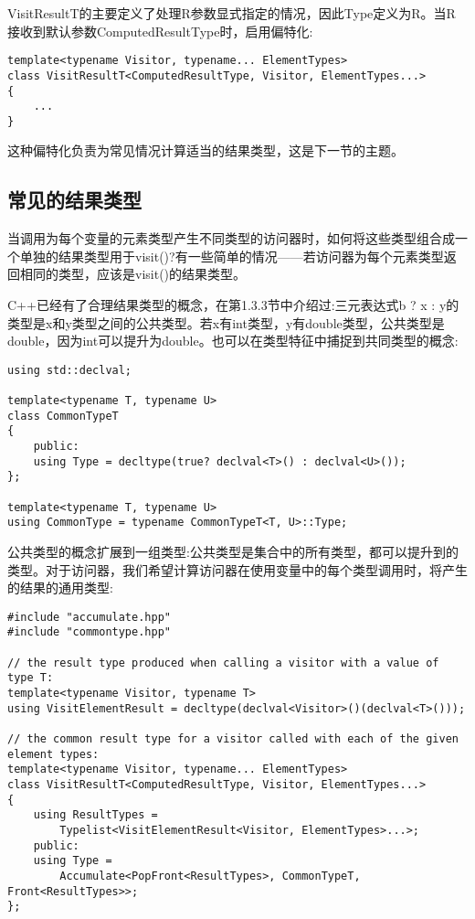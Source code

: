 VisitResultT的主要定义了处理R参数显式指定的情况，因此Type定义为R。当R接收到默认参数ComputedResultType时，启用偏特化:

\begin{lstlisting}[style=styleCXX]
template<typename Visitor, typename... ElementTypes>
class VisitResultT<ComputedResultType, Visitor, ElementTypes...>
{
	...
}
\end{lstlisting}

这种偏特化负责为常见情况计算适当的结果类型，这是下一节的主题。

\subsection{常见的结果类型}

当调用为每个变量的元素类型产生不同类型的访问器时，如何将这些类型组合成一个单独的结果类型用于visit()?有一些简单的情况——若访问器为每个元素类型返回相同的类型，应该是visit()的结果类型。

C++已经有了合理结果类型的概念，在第1.3.3节中介绍过:三元表达式b ? x : y的类型是x和y类型之间的公共类型。若x有int类型，y有double类型，公共类型是double，因为int可以提升为double。也可以在类型特征中捕捉到共同类型的概念:

\begin{lstlisting}[style=styleCXX]
using std::declval;

template<typename T, typename U>
class CommonTypeT
{
	public:
	using Type = decltype(true? declval<T>() : declval<U>());
};

template<typename T, typename U>
using CommonType = typename CommonTypeT<T, U>::Type;
\end{lstlisting}

公共类型的概念扩展到一组类型:公共类型是集合中的所有类型，都可以提升到的类型。对于访问器，我们希望计算访问器在使用变量中的每个类型调用时，将产生的结果的通用类型:

\begin{lstlisting}[style=styleCXX]
#include "accumulate.hpp"
#include "commontype.hpp"

// the result type produced when calling a visitor with a value of type T:
template<typename Visitor, typename T>
using VisitElementResult = decltype(declval<Visitor>()(declval<T>()));

// the common result type for a visitor called with each of the given element types:
template<typename Visitor, typename... ElementTypes>
class VisitResultT<ComputedResultType, Visitor, ElementTypes...>
{
	using ResultTypes =
		Typelist<VisitElementResult<Visitor, ElementTypes>...>;
	public:
	using Type =
		Accumulate<PopFront<ResultTypes>, CommonTypeT, Front<ResultTypes>>;
};
\end{lstlisting}

